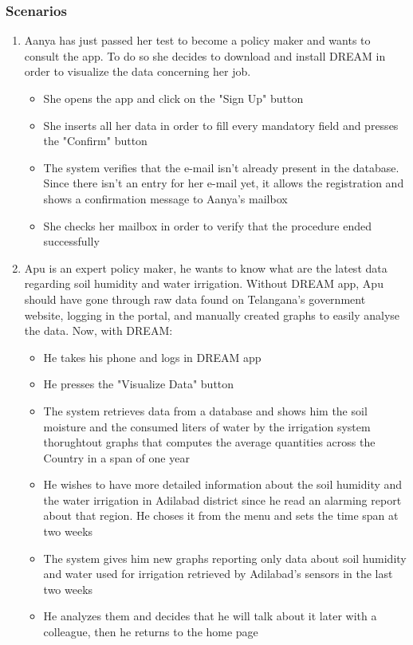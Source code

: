 \documentclass[table, 12pt]{article}
\begin{document}
\subsubsection{Scenarios}
\label{scenarios}
\begin{enumerate}

    \item Aanya has just passed her test to become a policy maker and wants to consult the app.
    To do so she decides to download and install DREAM in order to visualize the data concerning her job.
    \begin{itemize}
        \item She opens the app and click on the "Sign Up" button
        \item She inserts all her data in order to fill every mandatory field and presses the "Confirm" button
        \item The system verifies that the e-mail isn't already present in the database. Since there isn't an entry for her e-mail yet, it allows the registration and shows a confirmation message to Aanya's mailbox
        \item She checks her mailbox in order to verify that the procedure ended successfully
    \end{itemize}

    \item Apu is an expert policy maker, he wants to know what are the latest data regarding soil humidity and water irrigation.
    Without DREAM app, Apu should have gone through raw data found on Telangana's government website, logging in the portal, and manually created graphs to easily analyse the data. Now, with DREAM:
    \begin{itemize}
        \item He takes his phone and logs in DREAM app 
        \item He presses the "Visualize Data" button
        \item The system retrieves data from a database and shows him the soil moisture and the consumed liters of water by the irrigation system thorughtout graphs that computes the average quantities across the Country in a span of one year
        \item He wishes to have more detailed information about the soil humidity and the water irrigation in Adilabad district since he read an alarming report about that region.
        He choses it from the menu and sets the time span at two weeks
        \item The system gives him new graphs reporting only data about soil humidity and water used for irrigation retrieved by Adilabad's sensors in the last two weeks
        \item He analyzes them and decides that he will talk about it later with a colleague, then he returns to the home page
    \end{itemize} 


\end{enumerate}
\end{document}
